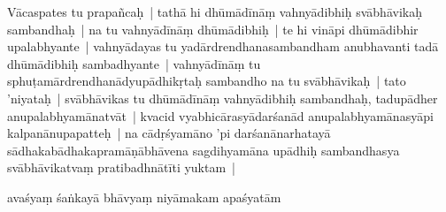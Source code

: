 \documentclass[article,12pt,a4paper]{memoir}%
\newcounter{parCount}
\begin{document}
	  \pstart \leavevmode%
	\label{thakur75-106.27}Vācaspates tu prapañcaḥ | tathā hi dhūmādīnāṃ vahnyādibhiḥ svābhāvikaḥ sambandhaḥ | na tu vahnyādīnāṃ dhūmādibhiḥ | te hi vināpi dhūmādibhir upalabhyante | vahnyādayas tu yadārdrendhanasambandham anubhavanti tadā dhūmādibhiḥ sambadhyante | vahnyādīnāṃ tu sphuṭamārdrendhanādyupādhikṛtaḥ sambandho na tu svābhāvikaḥ | tato 'niyataḥ | svābhāvikas tu dhūmādīnāṃ vahnyādibhiḥ sambandhaḥ, tadupādher anupalabhyamānatvāt | kvacid vyabhicārasyādarśanād anupalabhyamānasyāpi kalpanānupapatteḥ | na cādṛśyamāno 'pi darśanānarhatayā sādhakabādhakapramāṇābhāvena sagdihyamāna upādhiḥ sambandhasya svābhāvikatvaṃ pratibadhnātīti yuktam |
	{}
	\pend%
      

	  \pstart \leavevmode%
	avaśyaṃ śaṅkayā bhāvyaṃ niyāmakam apaśyatām 
	{}
	\pend%
      
\end{document}
